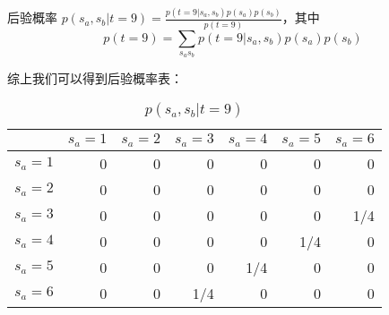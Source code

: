 \documentclass[10pt,a4paper,UTF8]{article}
\begin{document}
\begin{instance}
后验概率 \(p(s_{a},s_{b}|t=9) = \frac{p(t=9|s_{a},s_{b})p(s_{a})p(s_{b})}{p(t=9)}\)，其中\[p(t=9) = \sum_{s_{a}s_{b}} p(t=9| s_{a},s_{b})p(s_{a})p(s_{b})\] 

综上我们可以得到后验概率表：

\begin{table}[htbp]
\caption{\label{tab:orgf8e976b}
\(p(s_{a},s_{b}|t=9)\)}
\centering
\begin{tabular}{lrrrrrr}
\hline
 & \(s_{a} = 1\) & \(s_{a} = 2\) & \(s_{a} = 3\) & \(s_{a} = 4\) & \(s_{a} = 5\) & \(s_{a} = 6\)\\
\hline
\(s_{a} = 1\) & 0 & 0 & 0 & 0 & 0 & 0\\
\(s_{a} = 2\) & 0 & 0 & 0 & 0 & 0 & 0\\
\(s_{a} = 3\) & 0 & 0 & 0 & 0 & 0 & 1/4\\
\(s_{a} = 4\) & 0 & 0 & 0 & 0 & 1/4 & 0\\
\(s_{a} = 5\) & 0 & 0 & 0 & 1/4 & 0 & 0\\
\(s_{a} = 6\) & 0 & 0 & 1/4 & 0 & 0 & 0\\
\hline
\end{tabular}
\end{table}
\end{instance}
\end{document}
